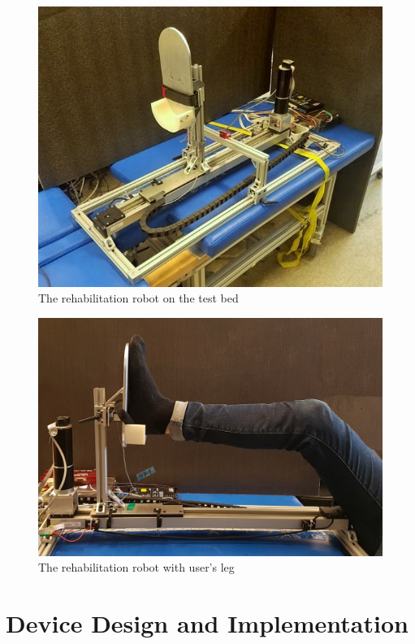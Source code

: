 \documentclass[12pt]{report}
\begin{document}
	\begin{figure}[h] 
		\centering
		\includegraphics[width=\linewidth]{device_pic1}
		\caption{The rehabilitation robot on the test bed}
		\label{fig:robot_on_bed}
	\end{figure}


	\begin{figure}[h] 
		\centering
		\includegraphics[width=\linewidth]{robot_leg}
		\caption{The rehabilitation robot with user's leg}
		\label{fig:robot_leg}
	\end{figure}
	

\chapter{Device Design and Implementation} \label{ch2}
\end{document}
